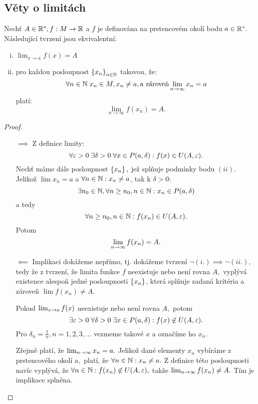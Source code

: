 \subsection{Věty o limitách}

\begin{theorem}[Heine]
    \label{th:heine}
    Nechť $A \in \mathbb{R}^*, f: M \rightarrow \mathbb{R}$ a $f$ je definována na prstencovém
    okolí bodu $a \in \mathbb{R}^*.$ Následující tvrzení jsou ekvivalentní:
    \begin{enumerate}[i.]
        \item $\lim_{x\to a} f(x) = A$
        \item pro každou posloupnost $\left\{x_n\right\}_{n \in \mathbb{N}}$ takovou, že:
            $$\forall n \in \mathbb{N} \; x_n \in M, x_n \neq a, \text{a zároveň} 
            \lim_{n \to \infty} x_n = a$$
            platí:
            $$\lim_{n\to\infty} f(x_n) = A.$$
    \end{enumerate}
\end{theorem}

\begin{proof}
    \leavevmode
    \begin{itemize}
        \item[$\implies$] Z definice limity:
            $$\forall \varepsilon > 0 \; \exists \delta > 0 \; \forall x \in P(a,\delta): 
            f(x) \in U(A,\varepsilon).$$
            Nechť máme dále posloupnost $\left\{x_n\right\},$ jež splňuje podmínky
            bodu $(ii)$. Jelikož $\lim x_n = a$ a $\forall n \in \mathbb{N}: x_n \neq a$, 
            tak k $\delta > 0:$
            $$\exists n_0 \in \mathbb{N}, \forall n \geq n_0, n\in\mathbb{N}: x_n \in P(a,\delta)$$
            a tedy 
            $$\forall n \geq n_0, n \in \mathbb{N}: f(x_n) \in U(A, \varepsilon).$$ 
            Potom
            $$\lim_{n\to\infty} f(x_n) = A.$$
        \item[$\impliedby$]
            Implikaci dokážeme nepřímo, tj. dokážeme tvrzení 
            $\neg (i.) \implies \neg (ii.),$
            tedy že z tvrzení, že limita funkce $f$ neexistuje nebo není
            rovna $A,$ vyplývá existence 
            alespoň jedné posloupnosti $\left\{x_n\right\}$, která splňuje zadaná 
            kritéria a zároveň $\lim f(x_n) \neq A.$

            Pokud $\lim_{x \to a} f(x)$ neexistuje nebo není rovna $A,$ potom
            $$\exists \varepsilon > 0 \; \forall \delta > 0 \; \exists x \in P(a,\delta):
            f(x) \not \in U(A,\varepsilon).$$
            Pro $\delta_n = \frac{1}{n}, n=1,2,3,\dots$ vezmeme takové $x$ a
            označíme ho $x_n.$ 
            
            Zřejmě platí, že $\lim_{n\to\infty} x_n = a.$ Jelikož dané elementy
            $x_n$ vybíráme z prstencového okolí $a,$ platí, že $\forall n \in \mathbb{N}:
            x_n \neq a.$ Z definice této posloupnosti navíc vyplývá, že 
            $\forall n \in \mathbb{N}: f(x_n) \not \in U(A,\varepsilon),$ takže $\lim_{n\to\infty}
            f(x_n) \neq A.$ Tím je implikace splněna.
    \end{itemize}
\end{proof}

